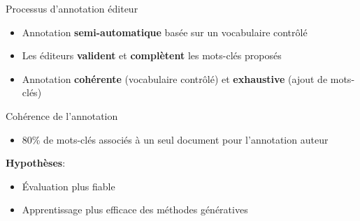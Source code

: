\begin{frame}{Processus d'annotation éditeur}
\begin{figure}
    \end{figure}
    
    \begin{itemize}
        \item Annotation \textbf{semi-automatique} basée sur un vocabulaire contrôlé
        \item Les éditeurs \textbf{valident} et \textbf{complètent} les mots-clés proposés
        \item Annotation \textbf{cohérente} (vocabulaire contrôlé) et \textbf{exhaustive} (ajout de mots-clés)
    \end{itemize}
    
\end{frame}

\begin{frame}{Cohérence de l'annotation}
    
    \begin{itemize}
        \item 80\% de mots-clés associés à un seul document pour l'annotation auteur
    \end{itemize}
    
    \textbf{Hypothèses}:
    \begin{itemize}
        \item \'Evaluation plus fiable
        \item Apprentissage plus efficace des méthodes génératives
    \end{itemize}
\end{frame}


